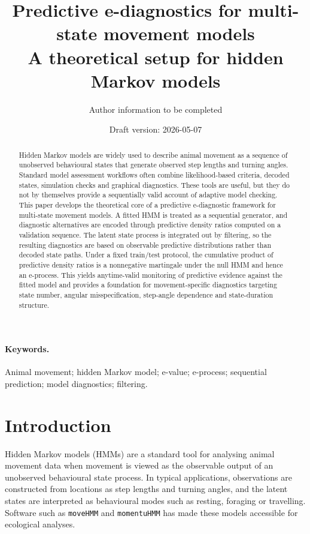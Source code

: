 \documentclass[11pt]{article}
\title{Predictive e-diagnostics for multi-state movement models\\A theoretical setup for hidden Markov models}
\author{Author information to be completed}
\date{Draft version: 2026-05-07}
\begin{document}
\maketitle

\begin{abstract}
Hidden Markov models are widely used to describe animal movement as a sequence of unobserved behavioural states that generate observed step lengths and turning angles. Standard model assessment workflows often combine likelihood-based criteria, decoded states, simulation checks and graphical diagnostics. These tools are useful, but they do not by themselves provide a sequentially valid account of adaptive model checking. This paper develops the theoretical core of a predictive e-diagnostic framework for multi-state movement models. A fitted HMM is treated as a sequential generator, and diagnostic alternatives are encoded through predictive density ratios computed on a validation sequence. The latent state process is integrated out by filtering, so the resulting diagnostics are based on observable predictive distributions rather than decoded state paths. Under a fixed train/test protocol, the cumulative product of predictive density ratios is a nonnegative martingale under the null HMM and hence an e-process. This yields anytime-valid monitoring of predictive evidence against the fitted model and provides a foundation for movement-specific diagnostics targeting state number, angular misspecification, step-angle dependence and state-duration structure.
\end{abstract}

\paragraph{Keywords.}
Animal movement; hidden Markov model; e-value; e-process; sequential prediction; model diagnostics; filtering.

\section{Introduction}

Hidden Markov models (HMMs) are a standard tool for analysing animal movement data when movement is viewed as the observable output of an unobserved behavioural state process. In typical applications, observations are constructed from locations as step lengths and turning angles, and the latent states are interpreted as behavioural modes such as resting, foraging or travelling. Software such as \texttt{moveHMM} \citep{michelot_2016_movehmm} and \texttt{momentuHMM} \citep{mcclintock_2018_momentuhmm} has made these models accessible for ecological analyses.
\end{document}
